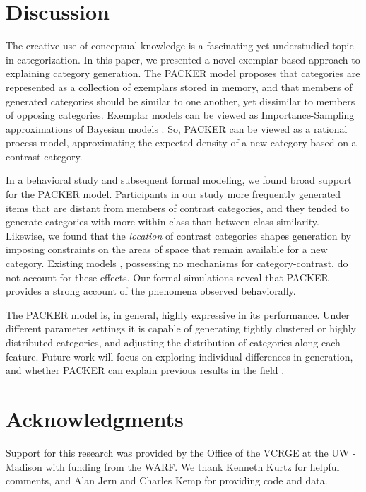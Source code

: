 \documentclass[10pt,letterpaper]{article}
\begin{document}
\section{Discussion}
The creative use of conceptual knowledge is a fascinating yet understudied topic in categorization. In this paper, we presented a novel exemplar-based approach to explaining category generation. The PACKER model proposes that categories are represented as a collection of exemplars stored in memory, and that members of generated categories should be similar to one another, yet dissimilar to members of opposing categories. Exemplar models can be viewed as Importance-Sampling approximations of Bayesian models \citep{shi10}. So, PACKER can be viewed as a rational process model, approximating the expected density of a new category based on a contrast category. 

In a behavioral study and subsequent formal modeling, we found broad support for the PACKER model. Participants in our study more frequently generated items that are distant from members of contrast categories, and they tended to generate categories with more within-class than between-class similarity. Likewise, we found that the \textit{location} of contrast categories shapes generation by imposing constraints on the areas of space that remain available for a new category. Existing models \citep[see][]{jern2013probabilistic}, possessing no mechanisms for category-contrast, do not account for these effects. Our formal simulations reveal that PACKER provides a strong account of the phenomena observed behaviorally.

The PACKER model is, in general, highly expressive in its performance. Under different parameter settings it is capable of generating tightly clustered or highly distributed categories, and adjusting the distribution of categories along each feature. Future work will focus on exploring individual differences in generation, and whether PACKER can explain previous results in the field \citep{ward1994structured,jern2013probabilistic}.

\section{Acknowledgments}
Support for this research was provided by the Office of the VCRGE at the UW - Madison with funding from the WARF. We thank Kenneth Kurtz for helpful comments, and Alan Jern and Charles Kemp for providing code and data.



\setlength{\bibleftmargin}{.025in}
\setlength{\bibindent}{-\bibleftmargin}

\end{document}
